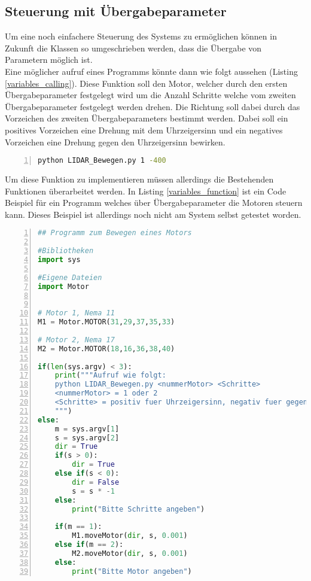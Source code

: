 \subsection{Steuerung mit Übergabeparameter}
Um eine noch einfachere Steuerung des Systems zu ermöglichen können in Zukunft die Klassen so umgeschrieben werden, dass die Übergabe von Parametern möglich ist.\\
Eine möglicher aufruf eines Programms könnte dann wie folgt aussehen (Listing \ref{variables_calling}). Diese Funktion soll den Motor, welcher durch den ersten Übergabeparameter festgelegt wird um die Anzahl Schritte welche vom zweiten Übergabeparameter festgelegt werden drehen. Die Richtung soll dabei durch das Vorzeichen des zweiten Übergabeparameters bestimmt werden. Dabei soll ein positives Vorzeichen eine Drehung mit dem Uhrzeigersinn und ein negatives Vorzeichen eine Drehung gegen den Uhrzeigersinn bewirken.
\begin{lstlisting}[caption={Beispiel Aufruf einer Python Funktion mit Übergabeparametern}, language={bash}, label={variables_calling}, numbers=left]
python LIDAR_Bewegen.py 1 -400
\end{lstlisting}
Um diese Funktion zu implementieren müssen allerdings die Bestehenden Funktionen überarbeitet werden. In Listing \ref{variables_function} ist ein Code Beispiel für ein Programm welches über Übergabeparameter die Motoren steuern kann. Dieses Beispiel ist allerdings noch nicht am System selbst getestet worden. 
\begin{lstlisting}[caption={Python Beispiel Funktion welche Übergabeparamenter akzeptiert und ausführt}, language={python}, label={variables_function}, numbers=left]
## Programm zum Bewegen eines Motors

#Bibliotheken
import sys

#Eigene Dateien
import Motor


# Motor 1, Nema 11
M1 = Motor.MOTOR(31,29,37,35,33)

# Motor 2, Nema 17
M2 = Motor.MOTOR(18,16,36,38,40)

if(len(sys.argv) < 3):
    print("""Aufruf wie folgt:
    python LIDAR_Bewegen.py <nummerMotor> <Schritte>
    <nummerMotor> = 1 oder 2
    <Schritte> = positiv fuer Uhrzeigersinn, negativ fuer gegen den Uhrzeigersinn
    """)
else:
    m = sys.argv[1]
    s = sys.argv[2]
    dir = True
    if(s > 0):
        dir = True
    else if(s < 0):
        dir = False
        s = s * -1
    else:
        print("Bitte Schritte angeben")

    if(m == 1):
        M1.moveMotor(dir, s, 0.001)
    else if(m == 2):
        M2.moveMotor(dir, s, 0.001)
    else:
        print("Bitte Motor angeben")

\end{lstlisting}

